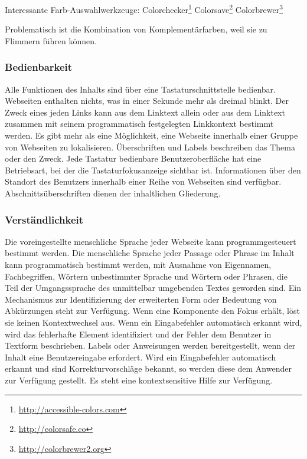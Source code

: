 Interessante Farb-Auswahlwerkzeuge:
Colorchecker\footnote{ \url{http://accessible-colors.com}}
Colorsave\footnote{ \url{http://colorsafe.co}}
Colorbrewer\footnote{ \url{http://colorbrewer2.org}}


Problematisch ist die Kombination von Komplementärfarben, weil sie zu Flimmern führen können.~\cite{HellbuschJanEric2011Bvuu}

\subsubsection*{Bedienbarkeit}
Alle Funktionen des Inhalts sind über eine Tastaturschnittstelle bedienbar.
Webseiten enthalten nichts, was in einer Sekunde mehr als dreimal blinkt.
Der Zweck eines jeden Links kann aus dem Linktext allein oder aus dem Linktext zusammen mit seinem programmatisch festgelegten Linkkontext bestimmt werden. Es gibt mehr als eine Möglichkeit, eine Webseite innerhalb einer Gruppe von Webseiten zu lokalisieren. Überschriften und Labels beschreiben das Thema oder den Zweck. Jede Tastatur bedienbare Benutzeroberfläche hat eine Betriebsart, bei der die Tastaturfokusanzeige sichtbar ist. Informationen über den Standort des Benutzers innerhalb einer Reihe von Webseiten sind verfügbar. Abschnittsüberschriften dienen der inhaltlichen Gliederung.



\subsubsection*{Verständlichkeit}

Die voreingestellte menschliche Sprache jeder Webseite kann programmgesteuert bestimmt werden. Die menschliche Sprache jeder Passage oder Phrase im Inhalt kann programmatisch bestimmt werden, mit Ausnahme von Eigennamen, Fachbegriffen, Wörtern unbestimmter Sprache und Wörtern oder Phrasen, die Teil der Umgangssprache des unmittelbar umgebenden Textes geworden sind. Ein Mechanismus zur Identifizierung der erweiterten Form oder Bedeutung von Abkürzungen steht zur Verfügung.  Wenn eine Komponente den Fokus erhält, löst sie keinen Kontextwechsel aus. Wenn ein Eingabefehler automatisch erkannt wird, wird das fehlerhafte Element identifiziert und der Fehler dem Benutzer in Textform beschrieben. Labels oder Anweisungen werden bereitgestellt, wenn der Inhalt eine Benutzereingabe erfordert.  Wird ein Eingabefehler automatisch erkannt und sind Korrekturvorschläge bekannt, so werden diese dem Anwender zur Verfügung gestellt.  Es steht eine kontextsensitive Hilfe zur Verfügung.



